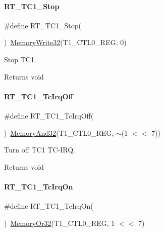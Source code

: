 \paragraph{\texorpdfstring{R\+T\+\_\+\+T\+C1\+\_\+\+Stop}{RT\_TC1\_Stop}}
{\footnotesize\ttfamily \#define R\+T\+\_\+\+T\+C1\+\_\+\+Stop(\begin{DoxyParamCaption}{ }\end{DoxyParamCaption})~\mbox{\hyperlink{a00020_ad9953f631a539cfaa35baf94f878b3ec}{Memory\+Write32}}(T1\+\_\+\+C\+T\+L0\+\_\+\+R\+EG, 0)}



Stop T\+C1. 

\begin{DoxyReturn}{Returns}
void 
\end{DoxyReturn}
\mbox{\label{a00044_ad8775d32f1b8cb982c2abf045e3b6b95}} 
\paragraph{\texorpdfstring{R\+T\+\_\+\+T\+C1\+\_\+\+Tc\+Irq\+Off}{RT\_TC1\_TcIrqOff}}
{\footnotesize\ttfamily \#define R\+T\+\_\+\+T\+C1\+\_\+\+Tc\+Irq\+Off(\begin{DoxyParamCaption}{ }\end{DoxyParamCaption})~\mbox{\hyperlink{a00020_a5c1a2bd4c1bd4c2f429d8042a45327ff}{Memory\+And32}}(T1\+\_\+\+C\+T\+L0\+\_\+\+R\+EG, $\sim$(1 $<$$<$ 7))}



Turn off T\+C1 T\+C-\/\+I\+RQ. 

\begin{DoxyReturn}{Returns}
void 
\end{DoxyReturn}
\mbox{\label{a00044_adbef657c94c7b32f07e4210fbf7f4745}} 
\paragraph{\texorpdfstring{R\+T\+\_\+\+T\+C1\+\_\+\+Tc\+Irq\+On}{RT\_TC1\_TcIrqOn}}
{\footnotesize\ttfamily \#define R\+T\+\_\+\+T\+C1\+\_\+\+Tc\+Irq\+On(\begin{DoxyParamCaption}{ }\end{DoxyParamCaption})~\mbox{\hyperlink{a00020_a9ea92ebccdef6bdaca4d00210cc7266d}{Memory\+Or32}}(T1\+\_\+\+C\+T\+L0\+\_\+\+R\+EG, 1 $<$$<$ 7)}



